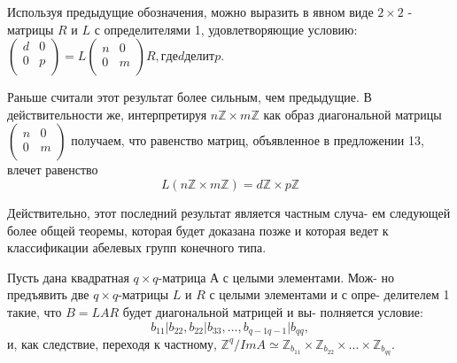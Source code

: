 \documentclass{mai_book}
\begin{document}
\begin{predl}
Используя предыдущие обозначения, можно выразить в явном виде \linebreak $2 \times 2$ - матрицы $R$ и $L$ с определителями 1, удовлетворяющие условию: 
${\left( \begin{array}{ccc}
d & 0 \\
0 & p \\
\end{array} \right)} =  L{\left( \begin{array}{ccc}
n & 0 \\
0 & m \\
\end{array} \right)}R, где d делит p.$
\end{predl}
\begin{mynotice}
Раньше считали этот результат более сильным, чем \linebreak предыдущие. В действительности же, интерпретируя $n \mathbb{Z} \times m \mathbb{Z}$ \linebreak как образ диагональной матрицы ${\left( \begin{array}{ccc}
n & 0 \\
0 & m \\
\end{array} \right)}$ получаем, что равенство \linebreak матриц, объявленное в предложении 13, влечет равенство   
$$L(n\mathbb{Z} \times m\mathbb{Z}) = d\mathbb{Z} \times p\mathbb{Z}$$
\end{mynotice}
\newpage
Действительно, этот последний результат является частным случа- \linebreak ем следующей более общей теоремы, которая будет доказана позже и \linebreak которая ведет к классификации абелевых групп конечного типа.  
\begin{thm}
Пусть дана квадратная $q \times q$-матрица $А$ с целыми элементами. Мож- \linebreak но предъявить две $q \times q$-матрицы $L$ и $R$ с целыми элементами и с опре- \linebreak делителем 1 такие, что $B = LAR$ будет диагональной матрицей и вы- \linebreak полняется условие:  
$$b_{11}|b_{22}, b_{22}|b_{33}, ..., b_{q-1 q-1}|b_{qq},$$
и, как следствие, переходя к частному, $\mathbb{Z}^q / ImA \simeq \mathbb{Z}_{b_{11}} \times \mathbb{Z}_{b_{22}} \times ... \times \mathbb{Z}_{b_{qq}}.$
\end{thm}
\end{document}
